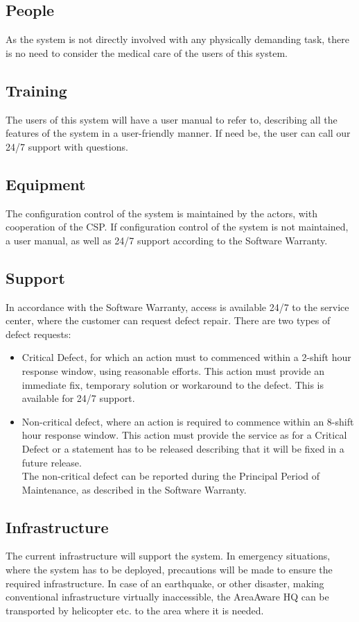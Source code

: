 \subsection{People}
As the system is not directly involved with any physically demanding task, there is no need to consider the medical care of the users of this system.

\subsection{Training}
The users of this system will have a user manual to refer to, describing all the features of the system in a user-friendly manner. If need be, the user can call our 24/7 support with questions.

\subsection{Equipment}
The configuration control of the system is maintained by the actors, with cooperation of the CSP. If configuration control of the system is not maintained, a user manual, as well as 24/7 support according to the Software Warranty. 

\subsection{Support}
In accordance with the Software Warranty, access is available 24/7 to the service center, where the customer can request defect repair. There are two types of defect requests:
\begin{itemize}
	\itemsep0em
	\item Critical Defect, for which an action must to commenced within a 2-shift hour response window, using reasonable efforts. This action must provide an immediate fix, temporary solution or workaround to the defect. This is available for 24/7 support.
	\item Non-critical defect, where an action is required to commence within an 8-shift hour response window. This action must provide the service as for a Critical Defect or a statement has to be released describing that it will be fixed in a future release. \\
	The non-critical defect can be reported during the Principal Period of Maintenance, as described in the Software Warranty.
\end{itemize}

\subsection{Infrastructure}
The current infrastructure will support the system. In emergency situations, where the system has to be deployed, precautions will be made to ensure the required infrastructure.
In case of an earthquake, or other disaster, making conventional infrastructure virtually inaccessible, the AreaAware HQ can be transported by helicopter etc. to the area where it is needed.

